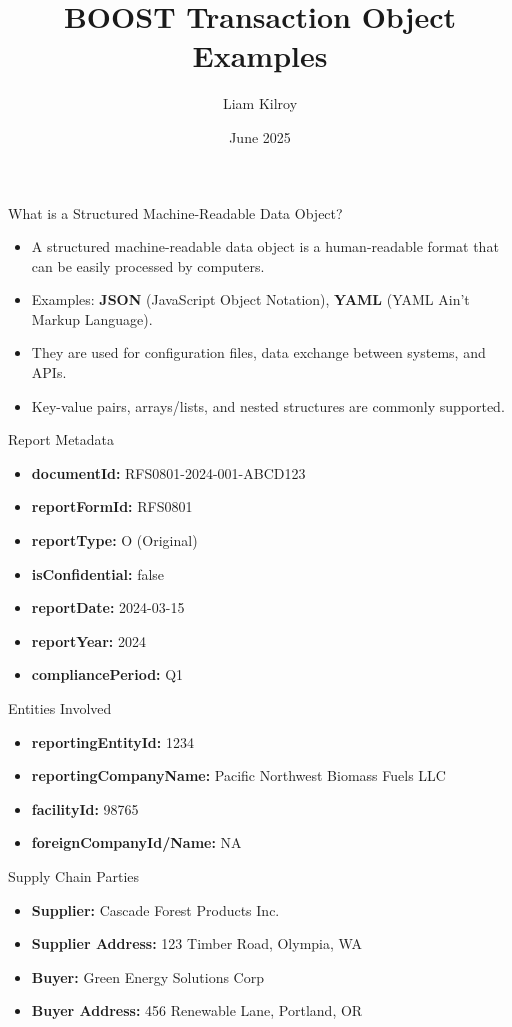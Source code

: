 \documentclass{beamer}
\title{BOOST Transaction Object Examples}
\author{Liam Kilroy}
\date{June 2025}
\begin{document}
\begin{frame}{What is a Structured Machine-Readable Data Object?}
\begin{itemize}
  \item A structured machine-readable data object is a human-readable format that can be easily processed by computers.
  \item Examples: \textbf{JSON} (JavaScript Object Notation), \textbf{YAML} (YAML Ain't Markup Language).
  \item They are used for configuration files, data exchange between systems, and APIs.
  \item Key-value pairs, arrays/lists, and nested structures are commonly supported. 
\end{itemize}
\end{frame}

\begin{frame}{Report Metadata}
\begin{itemize}
  \item \textbf{documentId:} RFS0801-2024-001-ABCD123
  \item \textbf{reportFormId:} RFS0801
  \item \textbf{reportType:} O (Original)
  \item \textbf{isConfidential:} false
  \item \textbf{reportDate:} 2024-03-15
  \item \textbf{reportYear:} 2024
  \item \textbf{compliancePeriod:} Q1
\end{itemize}
\end{frame}

\begin{frame}{Entities Involved}
\begin{itemize}
  \item \textbf{reportingEntityId:} 1234
  \item \textbf{reportingCompanyName:} Pacific Northwest Biomass Fuels LLC
  \item \textbf{facilityId:} 98765
  \item \textbf{foreignCompanyId/Name:} NA
\end{itemize}
\end{frame}

\begin{frame}{Supply Chain Parties}
\begin{itemize}
  \item \textbf{Supplier:} Cascade Forest Products Inc.
  \item \textbf{Supplier Address:} 123 Timber Road, Olympia, WA
  \item \textbf{Buyer:} Green Energy Solutions Corp
  \item \textbf{Buyer Address:} 456 Renewable Lane, Portland, OR
\end{itemize}
\end{frame}
\end{document}
